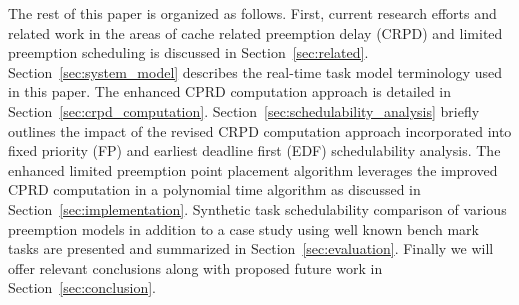 The rest of this paper is organized as follows. First, current research efforts and related work in the areas of cache related preemption delay (CRPD) and limited preemption scheduling is discussed in Section~\ref{sec:related}.  Section~\ref{sec:system_model} describes the real-time task model terminology used in this paper.  The enhanced CPRD computation approach is detailed in Section~\ref{sec:crpd_computation}. Section~\ref{sec:schedulability_analysis} briefly outlines the impact of the revised CRPD computation approach incorporated into fixed priority (FP) and earliest deadline first (EDF) schedulability analysis.  The enhanced limited preemption point placement algorithm leverages the improved CPRD computation in a polynomial time algorithm as discussed in Section~\ref{sec:implementation}.  Synthetic task schedulability comparison of various preemption models in addition to a case study using well known bench mark tasks are presented and summarized in Section~\ref{sec:evaluation}.  Finally we will offer relevant conclusions along with proposed future work in Section~\ref{sec:conclusion}. 